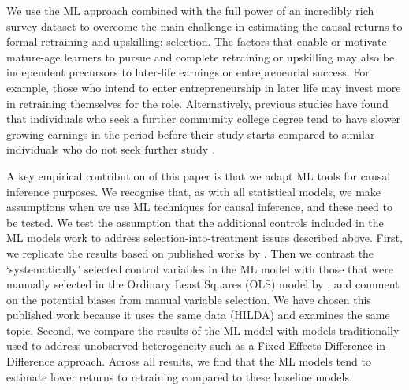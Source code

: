 \documentclass[12pt, a4paper]{article}
\begin{document}
We use the ML approach combined with the full power of an incredibly rich survey dataset to overcome the main challenge in estimating the causal returns to formal retraining and upskilling: selection. The factors that enable or motivate mature-age learners to pursue and complete retraining or upskilling may also be independent precursors to later-life earnings or entrepreneurial success. For example, those who intend to enter entrepreneurship in later life may invest more in retraining themselves for the role. Alternatively, previous studies have found that individuals who seek a further community college degree tend to have slower growing earnings in the period before their study starts compared to similar individuals who do not seek further study \citep{jacobson2005, dynarski2016, dynarski2018}. 

A key empirical contribution of this paper is that we adapt ML tools for causal inference purposes. We recognise that, as with all statistical models, we make assumptions when we use ML techniques for causal inference, and these need to be tested. We test the assumption that the additional controls included in the ML models work to address selection-into-treatment issues described above. First, we replicate the results based on published works by \cite{chesters2015}. Then we contrast the `systematically' selected control variables in the ML model with those that were manually selected in the Ordinary Least Squares (OLS) model by \cite{chesters2015}, and comment on the potential biases from manual variable selection. We have chosen this published work because it uses the same data (HILDA) and examines the same topic. Second, we compare the results of the ML model with models traditionally used to address unobserved heterogeneity such as a Fixed Effects Difference-in-Difference approach. Across all results, we find that the ML models tend to estimate lower returns to retraining compared to these baseline models.
\end{document}
